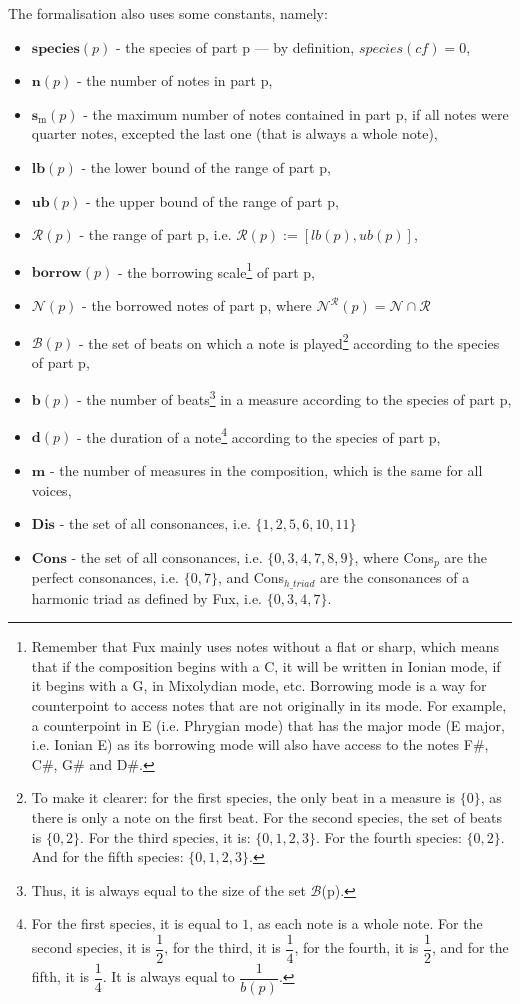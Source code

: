 \noindent The formalisation also uses some constants, namely:
\begin{itemize}
    \item $\textbf{species}(p)$ - the species of part p --- by definition, $species(\mathit{cf}) = 0$,
    \item $\textbf{n}(p)$ - the number of notes in part p,
    \item $\textbf{s$_\text{m}$}(p)$ - the maximum number of notes contained in part p, if all notes were quarter notes, excepted the last one (that is always a whole note),
    \item $\textbf{lb}(p)$ - the lower bound of the range of part p,
    \item $\textbf{ub}(p)$ - the upper bound of the range of part p,
    \item $\mathcal{R}(p)$ - the range of part p, i.e. $\mathcal{R}(p) := [lb(p), ub(p)]$,
    \item $\textbf{borrow}(p)$ - the borrowing scale\footnote{Remember that Fux mainly uses notes without a flat or sharp, which means that if the composition begins with a C, it will be written in Ionian mode, if it begins with a G, in Mixolydian mode, etc. Borrowing mode is a way for counterpoint to access notes that are not originally in its mode. For example, a counterpoint in E (i.e. Phrygian mode) that has the major mode (E major, i.e. Ionian E) as its borrowing mode will also have access to the notes F\#, C\#, G\# and D\#.} of part p,
    \item $\mathcal{N}(p)$ - the borrowed notes of part p, where $\mathcal{N}^{\mathcal{R}}(p) = \mathcal{N} \cap \mathcal{R}$
    \item $\mathcal{B}(p)$ - the set of beats on which a note is played\footnote{To make it clearer: for the first species, the only beat in a measure is $\{0\}$, as there is only a note on the first beat. For the second species, the set of beats is $\{0, 2\}$. For the third species, it is: $\{0, 1, 2, 3\}$. For the fourth species: $\{0, 2\}$. And for the fifth species: $\{0, 1, 2, 3\}$.} according to the species of part p,
    \item $\textbf{b}(p)$ - the number of beats\footnote{Thus, it is always equal to the size of the set $\mathcal{B}$(p).} in a measure according to the species of part p,
    \item $\textbf{d}(p)$ - the duration of a note\footnote{For the first species, it is equal to $1$, as each note is a whole note. For the second species, it is $\dfrac{1}{2}$, for the third, it is $\dfrac{1}{4}$, for the fourth, it is $\dfrac{1}{2}$, and for the fifth, it is $\dfrac{1}{4}$. It is always equal to $\dfrac{1}{b(p)}$.} according to the species of part p,
    \item $\textbf{m}$ - the number of measures in the composition, which is the same for all voices,
    \item $\textbf{Dis}$ - the set of all consonances, i.e. $\{1, 2,5, 6, 10, 11\}$
    \item $\textbf{Cons}$ - the set of all consonances, i.e. $\{0, 3, 4, 7, 8, 9\}$, where Cons$_p$ are the perfect consonances, i.e. $\{0, 7\}$, and Cons$_{h\_triad}$ are the consonances of a harmonic triad as defined by Fux, i.e. $\{0, 3, 4, 7\}$.
\end{itemize}
